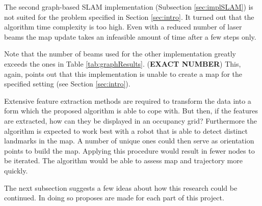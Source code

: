 \documentclass{ba-kecs}
\begin{document}
The second graph-based SLAM implementation \cite{Thrun} (Subsection \ref{sec:implSLAM}) is not suited for the problem specified in Section \ref{sec:intro}.
It turned out that the algorithm time complexity is too high. Even with a reduced number of laser beams the map update takes an infeasible amount of time after a few steps only. 

\begin{table}[h]
\begin{center}
\end{center}
\caption{The time the Graph SLAM implementation proposed by \citep{Thrun} needed using the specified number of laser beams after the specified number of steps.}
\label{tab:graphResults}
\end{table}

Note that the number of beams used for the other implementation greatly exceeds the ones in Table \ref{tab:graphResults}. (\textbf{EXACT NUMBER})
This, again, points out that this implementation is unable to create a map for the specified setting (see Section \ref{sec:intro}).

Extensive feature extraction methods are required to transform the data into a form which the proposed algorithm is able to cope with. But then, if the features are extracted, how can they be displayed in an occupancy grid? Furthermore the algorithm is expected to work best with a robot that is able to detect distinct landmarks in the map. A number of unique ones could then serve as orientation points to build the map. Applying this procedure would result in fewer nodes to be iterated. The algorithm would be able to assess map and trajectory more quickly.

The next subsection suggests a few ideas about how this research could be continued. In doing so proposes are made for each part of this project.
\end{document}
